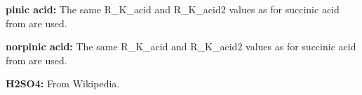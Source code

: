 \item {\bf  pinic acid:} The same R\_K\_acid and R\_K\_acid2 values as for succinic acid from \citet  {3034} are used.
\item {\bf  norpinic acid:} The same R\_K\_acid and R\_K\_acid2 values as for succinic acid from \citet  {3034} are used.
\item {\bf  H2SO4:} From Wikipedia.
